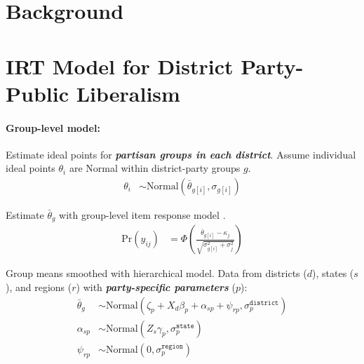 \documentclass[a0]{a0poster}
\begin{document}
\vspace{2cm} %
%
%
%
%
%
%
%
%
\begin{multicols*}{3}

\LARGE
\raggedright

\raggedcolumns

\section*{Background}

\columnbreak



\section*{IRT Model for District Party-Public Liberalism}

\paragraph{Group-level model:}
Estimate ideal points for \textbf{\emph{partisan groups in each district}}. Assume individual ideal points $\theta_{i}$ are Normal within district-party groups $g$.
\begin{align}
  \theta_{i} &\sim \mathrm{Normal}\left( \bar{\theta}_{g[i]} , \sigma_{g[i]} \right)
\end{align}

Estimate $\bar{\theta}_{g}$ with group-level item response model \parencite{caughey2015dynamic}.
\begin{align}
  \mathrm{Pr}\left( y_{\mathit{ij}} \right) &= 
    \Phi\left( 
      \frac{
        \bar{\theta}_{g[i]} - \kappa_{j}
      }{
        \sqrt{ \sigma_{g[i]}^{2} + \sigma^{2}_{j} }
      } 
    \right)
\end{align}

Group means smoothed with hierarchical model. Data from districts ($d$), states ($s$), and regions ($r$) with \emph{\textbf{party-specific parameters}} ($p$):
\begin{align}
  \bar{\theta}_{g} &\sim \mathrm{Normal}\left(\zeta_{p} + X_{d}\beta_{p} + \alpha_{sp} + \psi_{rp}, \sigma^{\texttt{district}}_{p} \right) \\[12pt]
  \alpha_{sp} &\sim \mathrm{Normal}\left( Z_{s}\gamma_{p}, \sigma_{p}^{\texttt{state}} \right) \\[12pt]
  \psi_{rp} &\sim \mathrm{Normal}\left(0, \sigma_{p}^{\texttt{region}}\right)
\end{align}



\end{multicols*}
\end{document}
